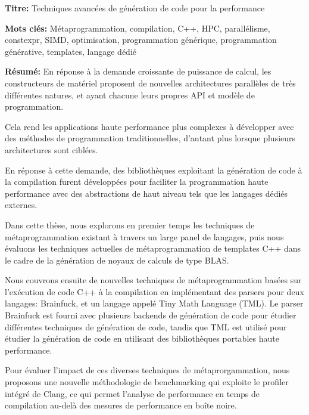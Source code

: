 \documentclass[english,12pt,a4paper]{book}
\begin{document}
\begin{mdframed}[linecolor=Prune,linewidth=1]

\textbf{Titre:} Techniques avanc\'ees de g\'en\'eration de code pour
la performance

\noindent \textbf{Mots clés:}
M\'etaprogrammation, compilation, C++, HPC, parall\'elisme, constexpr, SIMD,
optimisation, programmation g\'en\'erique, programmation g\'en\'erative,
templates, langage d\'edi\'e

\vspace{-.5cm}
\begin{multicols}{2}
\noindent \textbf{Résumé:}
En r\'eponse \`a la demande croissante de puissance de calcul,
les constructeurs de mat\'eriel proposent de nouvelles architectures
parall\`eles de tr\`es diff\'erentes natures, et ayant chacune leurs propres
API et mod\`ele de programmation.

Cela rend les applications haute performance plus complexes \`a d\'evelopper
avec des m\'ethodes de programmation traditionnelles, d'autant plus lorsque
plusieurs architectures sont cibl\'ees.

En r\'eponse \`a cette demande, des biblioth\`eques exploitant la
g\'en\'eration de code \`a la compilation furent d\'evelopp\'ees pour faciliter
la programmation haute performance avec des abstractions de haut niveau tels
que les langages d\'edi\'es externes.

Dans cette th\`ese, nous explorons en premier temps les techniques de
m\'etaprogrammation existant \`a travers un large panel de langages, puis nous
\'evaluons les techniques actuelles de m\'etaprogrammation de templates C++
dans le cadre de la g\'en\'eration de noyaux de calculs de type BLAS.

Nous couvrons ensuite de nouvelles techniques de m\'etaprogrammation bas\'ees
sur l'ex\'ecution de code C++ \`a la compilation en impl\'ementant des parsers
pour deux langages: Brainfuck, et un langage appel\'e Tiny Math Language (TML).
Le parser Brainfuck est fourni avec plusieurs backends de g\'en\'eration de code
pour \'etudier diff\'erentes techniques de g\'en\'eration de code, tandis que
TML est utilis\'e pour \'etudier la g\'en\'eration de code en utilisant des
biblioth\`eques portables haute performance.

Pour \'evaluer l'impact de ces diverses techniques de m\'etaprorgammation,
nous proposons une nouvelle m\'ethodologie de benchmarking qui exploite
le profiler int\'egr\'e de Clang, ce qui permet l'analyse de performance
en temps de compilation au-del\`a des mesures de performance en bo\^ite noire.

\end{multicols}

\end{mdframed}
\end{document}
